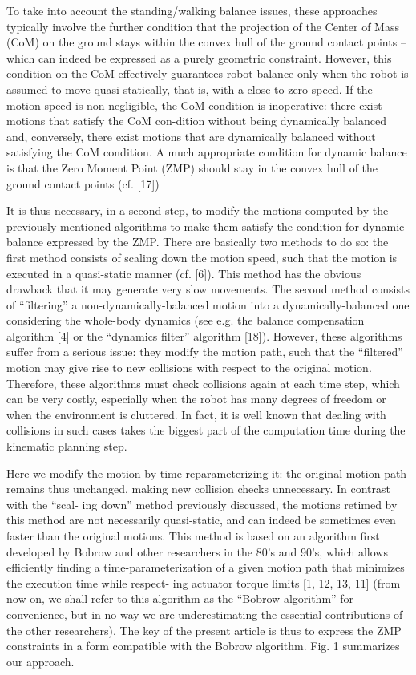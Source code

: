 \documentclass[journal]{IEEEtran}
\begin{document}
To take into account the standing/walking balance issues,
these approaches typically involve the further condition that the projection of the Center of Mass (CoM) on the ground stays within the convex hull of the ground contact points – which can indeed be expressed as a purely geometric constraint. However, this condition on the CoM effectively guarantees robot balance only when the robot is assumed to move quasi-statically, that is, with a close-to-zero speed. If the motion speed is non-negligible, the CoM condition is inoperative: there exist motions that satisfy the CoM con-dition without being dynamically balanced and, conversely, there exist motions that are dynamically balanced without satisfying the CoM condition. A much appropriate condition for dynamic balance is that the Zero Moment Point (ZMP) should stay in the convex hull of the ground contact points (cf. [17])

It is thus necessary, in a second step, to modify the motions
computed by the previously mentioned algorithms to make
them satisfy the condition for dynamic balance expressed
by the ZMP. There are basically two methods to do so:
the first method consists of scaling down the motion speed,
such that the motion is executed in a quasi-static manner
(cf. [6]). This method has the obvious drawback that it
may generate very slow movements. The second method
consists of “filtering” a non-dynamically-balanced motion
into a dynamically-balanced one considering the whole-body
dynamics (see e.g. the balance compensation algorithm [4]
or the “dynamics filter” algorithm [18]). However, these
algorithms suffer from a serious issue: they modify the
motion path, such that the “filtered” motion may give rise to
new collisions with respect to the original motion. Therefore,
these algorithms must check collisions again at each time
step, which can be very costly, especially when the robot
has many degrees of freedom or when the environment is
cluttered. In fact, it is well known that dealing with collisions
in such cases takes the biggest part of the computation time
during the kinematic planning step.

Here we modify the motion by time-reparameterizing it:
the original motion path remains thus unchanged, making
new collision checks unnecessary. In contrast with the “scal-
ing down” method previously discussed, the motions retimed
by this method are not necessarily quasi-static, and can
indeed be sometimes even faster than the original motions.
This method is based on an algorithm first developed by
Bobrow and other researchers in the 80’s and 90’s, which
allows efficiently finding a time-parameterization of a given
motion path that minimizes the execution time while respect-
ing actuator torque limits [1, 12, 13, 11] (from now on,
we shall refer to this algorithm as the “Bobrow algorithm”
for convenience, but in no way we are underestimating the
essential contributions of the other researchers). The key of
the present article is thus to express the ZMP constraints
in a form compatible with the Bobrow algorithm. Fig. 1
summarizes our approach.
\end{document}

